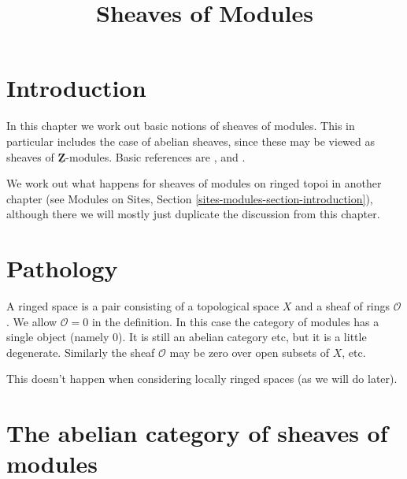 \documentclass{stacks-project}
\theoremstyle{plain}
\theoremstyle{definition}
\theoremstyle{remark}
\numberwithin{equation}{subsection}
\begin{document}
\title{Sheaves of Modules}


\maketitle

\label{section-phantom}

\tableofcontents

\section{Introduction}
\label{section-introduction}

\noindent
In this chapter we work out basic notions of sheaves of modules.
This in particular includes the case of abelian sheaves, since
these may be viewed as sheaves of $\underline{\mathbf{Z}}$-modules.
Basic references are \cite{FAC}, \cite{EGA} and \cite{SGA4}.

\medskip\noindent
We work out what happens for sheaves of modules on ringed topoi
in another chapter (see
Modules on Sites, Section \ref{sites-modules-section-introduction}),
although there we will mostly just duplicate the discussion
from this chapter.





\section{Pathology}
\label{section-pathology}

\noindent
A ringed space is a pair consisting of a topological space $X$
and a sheaf of rings $\mathcal{O}$. We allow $\mathcal{O} = 0$
in the definition. In this case the category of modules has a
single object (namely $0$). It is still an abelian category etc,
but it is a little degenerate. Similarly the sheaf $\mathcal{O}$
may be zero over open subsets of $X$, etc.

\medskip\noindent
This doesn't happen when considering locally ringed spaces (as we
will do later).








\section{The abelian category of sheaves of modules}
\label{section-kernels}
\end{document}
